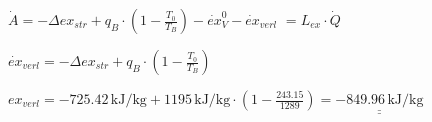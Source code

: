 \( \dot{A} = -\Delta ex_{str} + q_B \cdot \left( 1 - \frac{T_0}{T_B} \right) - \dot{ex}_V^0 - \dot{ex}_{verl} \)  
\( = L_{ex} \cdot \dot{Q} \)  

\( \dot{ex}_{verl} = -\Delta ex_{str} + q_B \cdot \left( 1 - \frac{T_0}{T_B} \right) \)  

\( ex_{verl} = -725.42 \, \text{kJ/kg} + 1195 \, \text{kJ/kg} \cdot \left( 1 - \frac{243.15}{1289} \right) = \underline{\underline{-849.96 \, \text{kJ/kg}}} \)